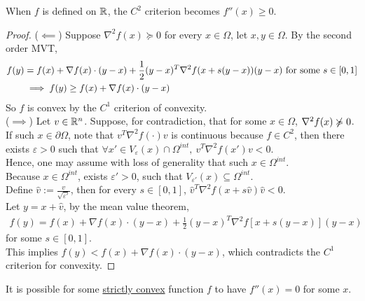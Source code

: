 \documentclass{article}
\begin{document}
    \begin{corollary}
    	When $f$ is defined on $\mathbb{R}$, the $C^2$ criterion becomes $f''(x) \geq 0$.
    \end{corollary}
    
    \begin{proof}
        ($\impliedby$) Suppose $\nabla^2 f(x) \succcurlyeq 0$ for every $x \in \Omega$, let $x, y \in \Omega$. By the second order MVT,
        \begin{align}
        	f(y) &= f(x) + \nabla f(x) \cdot (y - x) + \frac{1}{2} (y-x)^T \nabla^2 f(x + s (y - x)) (y - x)\text{{ for some }} s \in [0, 1] \\
        	&\implies f(y) \geq f(x) + \nabla f(x) \cdot (y - x)
        \end{align}
        So $f$ is convex by the $C^1$ criterion of convexity.\\
        ($\implies$) Let $v \in \mathbb{R}^n$. Suppose, for contradiction, that for some $x \in \Omega$, $\nabla^2 f(x) \centernot \succcurlyeq 0$.\\
        If such $x \in \partial \Omega$, note that $v^T \nabla^2 f(\cdot) v$ is continuous because $f \in C^2$, then there exists $\varepsilon > 0$ such that $\forall x' \in V_\varepsilon(x) \cap \Omega^{int},\ v^T \nabla^2 f(x') v < 0$.\\
        Hence, one may assume with loss of generality that such $x \in \Omega^{int}$.\\
        Because $x \in \Omega^{int}$, exists $\varepsilon' > 0$, such that $V_{\varepsilon'}(x) \subseteq \Omega^{int}$.\\
        Define $\hat{v} := \frac{v}{\sqrt{\varepsilon'}}$, then for every $s \in [0, 1]$, $\hat{v}^T \nabla^2 f(x + s\hat{v}) \hat{v} < 0$.\\
        Let $y = x + \hat{v}$, by the mean value theorem, 
        \begin{align}
        	f(y) = f(x) + \nabla f(x) \cdot (y - x) + \frac{1}{2} (y - x)^T \nabla^2 f [x + s (y - x)] (y - x)
        \end{align}
	 	for some $s \in [0, 1]$.\\
        This implies $f(y) < f(x) + \nabla f(x) \cdot (y - x)$, which contradicts the $C^1$ criterion for convexity.
    \end{proof}
    
    \begin{remark}
    	It is possible for some \ul{strictly convex} function $f$ to have $f''(x) = 0$ for some $x$.
    \end{remark}
    
\end{document}
